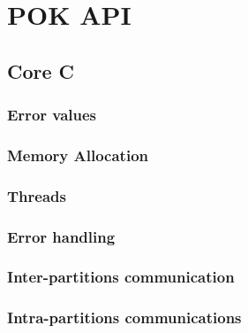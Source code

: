 %
%
%
%
%

\chapter{POK API}
   \label{chapter-api}

   \section{Core C}

   \subsection{Error values}
      

   \subsection{Memory Allocation}
      

   \subsection{Threads}
      

   \subsection{Error handling}
      

   \subsection{Inter-partitions communication}

      

   \subsection{Intra-partitions communications}
